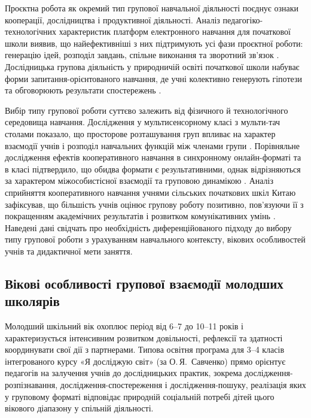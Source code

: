 \documentclass[a4paper,12pt]{article}
\begin{document}
Проєктна робота як окремий тип групової навчальної діяльності поєднує ознаки кооперації, дослідництва і продуктивної діяльності. Аналіз педагогіко-технологічних характеристик платформ електронного навчання для початкової школи виявив, що найефективніші з них підтримують усі фази проєктної роботи: генерацію ідей, розподіл завдань, спільне виконання та зворотний зв'язок \parencite{Baziukė2025}. Дослідницька групова діяльність у природничій освіті початкової школи набуває форми запитання-орієнтованого навчання, де учні колективно генерують гіпотези та обговорюють результати спостережень \parencite{Sakamoto2016105}.

Вибір типу групової роботи суттєво залежить від фізичного й технологічного середовища навчання. Дослідження у мультисенсорному класі з мульти-тач столами показало, що просторове розташування груп впливає на характер взаємодії учнів і розподіл навчальних функцій між членами групи \parencite{Mercier2016504}. Порівняльне дослідження ефектів кооперативного навчання в синхронному онлайн-форматі та в класі підтвердило, що обидва формати є результативними, однак відрізняються за характером міжособистісної взаємодії та груповою динамікою \parencite{Ralević2025}. Аналіз сприйняття кооперативного навчання учнями сільських початкових шкіл Китаю зафіксував, що більшість учнів оцінює групову роботу позитивно, пов'язуючи її з покращенням академічних результатів і розвитком комунікативних умінь \parencite{Xiao2025117}. Наведені дані свідчать про необхідність диференційованого підходу до вибору типу групової роботи з урахуванням навчального контексту, вікових особливостей учнів та дидактичної мети заняття.

\subsection{Вікові особливості групової взаємодії молодших школярів}

Молодший шкільний вік охоплює період від 6--7 до 10--11 років і характеризується інтенсивним розвитком довільності, рефлексії та здатності координувати свої дії з партнерами. Типова освітня програма для 3--4 класів інтегрованого курсу «Я досліджую світ» (за О.\,Я.~Савченко) прямо орієнтує педагогів на залучення учнів до дослідницьких практик, зокрема дослідження-розпізнавання, дослідження-спостереження і дослідження-пошуку, реалізація яких у груповому форматі відповідає природній соціальній потребі дітей цього вікового діапазону у спільній діяльності.
\end{document}
